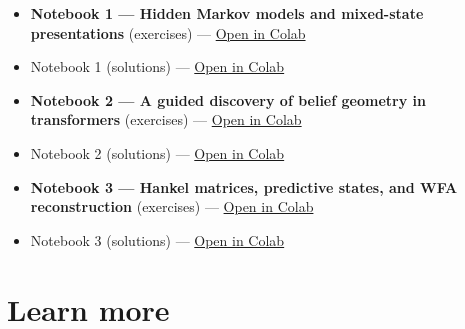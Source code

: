 \documentclass[11pt]{article}
\begin{document}
\begin{itemize}
\item
  \textbf{Notebook 1 --- Hidden Markov models and mixed-state presentations} (exercises) --- \href{https://colab.research.google.com/github/CharlesR-W/IliadIntensiveCompMechDay/blob/main/notebooks/01_hmms_msps_exercises.ipynb}{Open in Colab}
\item
  Notebook 1 (solutions) --- \href{https://colab.research.google.com/github/CharlesR-W/IliadIntensiveCompMechDay/blob/main/notebooks/01_hmms_msps_solutions.ipynb}{Open in Colab}
\item
  \textbf{Notebook 2 --- A guided discovery of belief geometry in transformers} (exercises) --- \href{https://colab.research.google.com/github/CharlesR-W/IliadIntensiveCompMechDay/blob/main/notebooks/02_transformer_belief_geometry_exercises.ipynb}{Open in Colab}
\item
  Notebook 2 (solutions) --- \href{https://colab.research.google.com/github/CharlesR-W/IliadIntensiveCompMechDay/blob/main/notebooks/02_transformer_belief_geometry_solutions.ipynb}{Open in Colab}
\item
  \textbf{Notebook 3 --- Hankel matrices, predictive states, and WFA reconstruction} (exercises) --- \href{https://colab.research.google.com/github/CharlesR-W/IliadIntensiveCompMechDay/blob/main/notebooks/03_hankel_psr_wfa_exercises.ipynb}{Open in Colab}
\item
  Notebook 3 (solutions) --- \href{https://colab.research.google.com/github/CharlesR-W/IliadIntensiveCompMechDay/blob/main/notebooks/03_hankel_psr_wfa_solutions.ipynb}{Open in Colab}
\end{itemize}

\section{Learn more}\label{learn-more}
\end{document}
